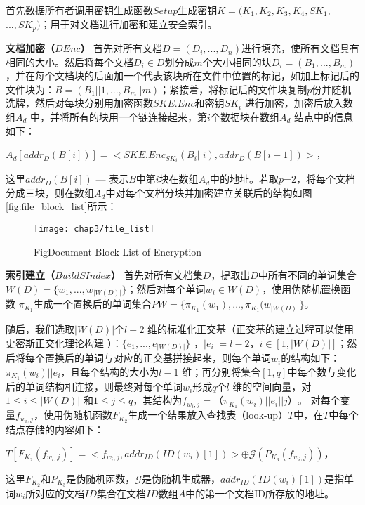 首先数据所有者调用密钥生成函数$Setup$生成密钥$K = (K_1, K_2, K_3, K_4, SK_1,$ $..., SK_p)$；用于对文档进行加密和建立安全索引。

\textbf{文档加密（$DEnc$）} 首先对所有文档$D=(D_i, ..., D_n)$进行填充，使所有文档具有相同的大小。然后将每个文档$D_i \in D$划分成$m$个大小相同的块$D_i = (B_1 , ... , B_m)$，并在每个文档块的后面加一个代表该块所在文件中位置的标记，如加上标记后的文件块为：$B = (B_1||1, ..., B_m||m)$；紧接着，将标记后的文件块复制$p$份并随机洗牌，然后对每块分别用加密函数$SKE.Enc$和密钥$SK_i$ 进行加密，加密后放入数组$A_d$ 中，并将所有的块用一个链连接起来，第$i$个数据块在数组$A_d$ 结点中的信息如下：
\begin{center}
$A_d[addr_{D}(B[i])] = <SKE.Enc_{SK_i}(B_i||i), addr_{D}(B[i+1])>$，
\end{center}

这里$addr_{D}(B[i])$ --- 表示$B$中第$i$块在数组$A_d$中的地址。若取$p$=2，将每个文档分成三块，则在数组$A_d$中对每个文档分块并加密建立关联后的结构如图\ref{fig:file_block_list}所示：
\begin{figure}[!htp]
  \centering
  \texttt{[image: chap3/file\_list]}

   {Fig}{Document Block List of Encryption}
\end{figure}


\textbf{索引建立（$BuildSIndex$）} 首先对所有文档集$D$，提取出$D$中所有不同的单词集合$W(D) = \{w_1, ..., w_{|W(D)|} \}$；然后对每个单词$w_i \in W(D)$，使用伪随机置换函数 $\pi_{K_1}$生成一个置换后的单词集合$PW = \{\pi_{K_1}(w_1), ..., \pi_{K_1}(w_{|W(D)|} \}$。

随后，我们选取$|W(D)|$个$l-2$ 维的标准化正交基（正交基的建立过程可以使用史密斯正交化理论构建
\cite{daniel1976reorthogonalization}）：$\{e_1, ..., e_{|W(D)|}\}$ ，$|e_i| = l-2$，$i \in [1, |W(D)|]$；然后将每个置换后的单词与对应的正交基拼接起来，则每个单词$w_i$的结构如下：$\pi_{K_1}(w_i) || e_i$，且每个结构的大小为$l-1$ 维；再分别将集合$[1,q]$中每个数与变化后的单词结构相连接，则最终对每个单词$w_i$形成$q$个$l$ 维的空间向量，对$1 \leq i \leq |W(D)|$ 和$1 \leq j \leq q$，其结构为$f_{w_i,j} = （\pi_{K_1}(w_i) || e_i || j）$。
对每个变量$f_{w_i,j}$，使用伪随机函数$F_{K_2}$生成一个结果放入查找表（look-up）$T$中，在$T$中每个结点存储的内容如下：
\begin{center}
    $T[F_{K_2}(f_{w_i,j})] = <f_{w_i,j}, addr_{ID}(ID(w_i)[1])> \oplus \mathcal{G}(P_{K_3}(f_{w_i,j}))$，
\end{center}
这里$F_{K_2}$和$P_{K_3}$是伪随机函数，$\mathcal{G}$是伪随机生成器，$addr_{ID}(ID(w_i)[1])$是指单词$w_i$所对应的文档$ID$集合在文档$ID$数组$A$中的第一个文档ID所存放的地址。


